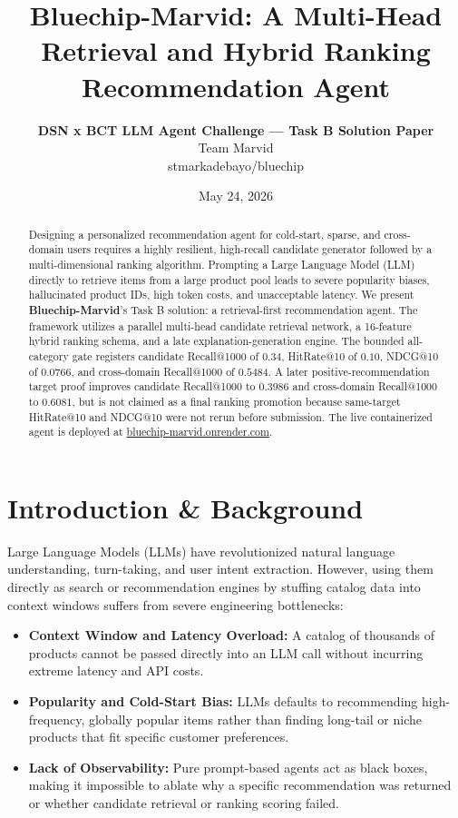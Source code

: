 \documentclass[11pt,a4paper]{article}
\title{\textbf{Bluechip-Marvid: A Multi-Head Retrieval and Hybrid Ranking Recommendation Agent}}
\author{\textbf{DSN x BCT LLM Agent Challenge — Task B Solution Paper} \\
Team Marvid \\
stmarkadebayo/bluechip}
\date{May 24, 2026}
\begin{document}
\maketitle

\begin{abstract}
Designing a personalized recommendation agent for cold-start, sparse, and cross-domain users requires a highly resilient, high-recall candidate generator followed by a multi-dimensional ranking algorithm. Prompting a Large Language Model (LLM) directly to retrieve items from a large product pool leads to severe popularity biases, hallucinated product IDs, high token costs, and unacceptable latency. We present \textbf{Bluechip-Marvid}'s Task B solution: a retrieval-first recommendation agent. The framework utilizes a parallel multi-head candidate retrieval network, a 16-feature hybrid ranking schema, and a late explanation-generation engine. The bounded all-category gate registers candidate Recall@1000 of $0.34$, HitRate@10 of $0.10$, NDCG@10 of $0.0766$, and cross-domain Recall@1000 of $0.5484$. A later positive-recommendation target proof improves candidate Recall@1000 to $0.3986$ and cross-domain Recall@1000 to $0.6081$, but is not claimed as a final ranking promotion because same-target HitRate@10 and NDCG@10 were not rerun before submission. The live containerized agent is deployed at \href{https://bluechip-marvid.onrender.com}{bluechip-marvid.onrender.com}.
\end{abstract}

\section{Introduction \& Background}
Large Language Models (LLMs) have revolutionized natural language understanding, turn-taking, and user intent extraction. However, using them directly as search or recommendation engines by stuffing catalog data into context windows suffers from severe engineering bottlenecks:
\begin{itemize}
    \item \textbf{Context Window and Latency Overload:} A catalog of thousands of products cannot be passed directly into an LLM call without incurring extreme latency and API costs.
    \item \textbf{Popularity and Cold-Start Bias:} LLMs defaults to recommending high-frequency, globally popular items rather than finding long-tail or niche products that fit specific customer preferences.
    \item \textbf{Lack of Observability:} Pure prompt-based agents act as black boxes, making it impossible to ablate why a specific recommendation was returned or whether candidate retrieval or ranking scoring failed.
\end{itemize}
\end{document}
